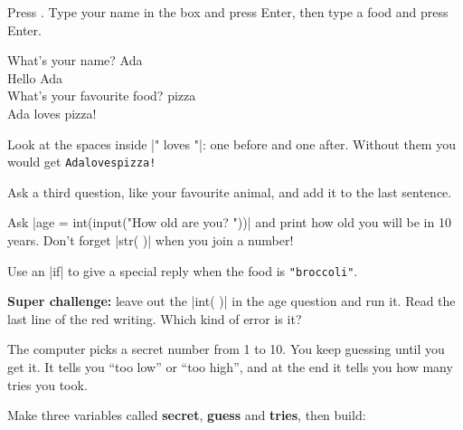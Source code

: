 Press \playbtn. Type your name in the box and press Enter, then type a food and press Enter.

\begin{outputbox}
What's your name? Ada\\
Hello Ada\\
What's your favourite food? pizza\\
Ada loves pizza!
\end{outputbox}

\begin{think}
Look at the spaces inside \py|" loves "|: one before and one after. Without them you would get \texttt{Adalovespizza!}
\end{think}

\begin{challenge}
\tick Ask a third question, like your favourite animal, and add it to the last sentence.\par
\tick Ask \py|age = int(input("How old are you? "))| and print how old you will be in 10 years. Don't forget \py|str( )| when you join a number!\par
\tick Use an \py|if| to give a special reply when the food is \texttt{"broccoli"}.\par
\tick \textbf{Super challenge:} leave out the \py|int( )| in the age question and run it. Read the last line of the red writing. Which kind of error is it?
\end{challenge}


The computer picks a secret number from 1 to 10. You keep guessing until you get it. It tells you ``too low'' or ``too high'', and at the end it tells you how many tries you took.

Make three variables called \textbf{secret}, \textbf{guess} and \textbf{tries}, then build:

\begin{center}
\begin{scratch}
\end{scratch}
\end{center}

